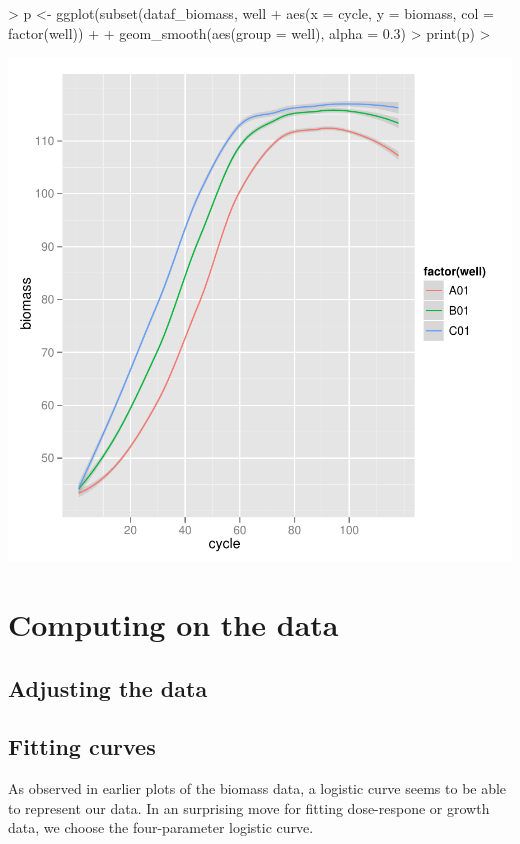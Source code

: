 \documentclass[a4paper,twoside]{article}
\begin{document}
\begin{Schunk}
\begin{Sinput}
> p <- ggplot(subset(dataf_biomass, well %
+      aes(x = cycle, y = biomass, col = factor(well)) +
+      geom_smooth(aes(group = well), alpha = 0.3)
> print(p)
> 
\end{Sinput}
\end{Schunk}
\includegraphics{htmf-006}


\section{Computing on the data}

\subsection{Adjusting the data}


\subsection{Fitting curves}

As observed in earlier plots of the biomass data, a logistic curve seems to be able to represent
our data. In an surprising move for fitting dose-respone or growth data, we choose the four-parameter logistic curve.
\end{document}
